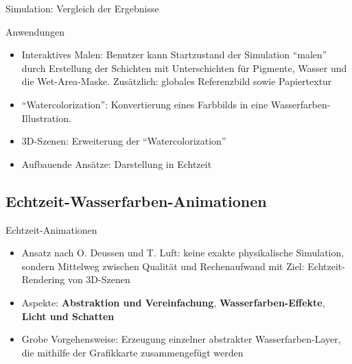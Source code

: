 \begin{frame}{Simulation: Vergleich der Ergebnisse}
  \centering{}\par
  \centering{}
\end{frame}

\begin{frame}{Anwendungen}
  \begin{itemize}
    \item Interaktives Malen: Benutzer kann Startzustand der Simulation
    "`malen"' durch Erstellung der Schichten mit Unterschichten für Pigmente,
    Wasser und die Wet-Area-Maske. Zusätzlich: globales Referenzbild sowie
    Papiertextur
    \item "`Watercolorization"': Konvertierung eines Farbbilds in eine
    Wasserfarben-Illustration.
    \item 3D-Szenen: Erweiterung der "`Watercolorization"'
    \item Aufbauende Ansätze: Darstellung in Echtzeit
  \end{itemize}
\end{frame}

\subsection{Echtzeit-Wasserfarben-Animationen}
\begin{frame}{Echtzeit-Animationen}
  \begin{itemize}
    \item Ansatz nach O. Deussen und T. Luft: keine exakte physikalische 
    Simulation, sondern Mittelweg zwischen Qualität und Rechenaufwand mit Ziel: 
    Echtzeit-Rendering von 3D-Szenen
    \item Aspekte: \textbf{Abstraktion und Vereinfachung},
    \textbf{Wasserfarben-Effekte}, \textbf{Licht und Schatten}
    \item Grobe Vorgehensweise: Erzeugung einzelner abstrakter 
    Wasserfarben-Layer, die mithilfe der Grafikkarte zusammengefügt werden
  \end{itemize}
\end{frame}

